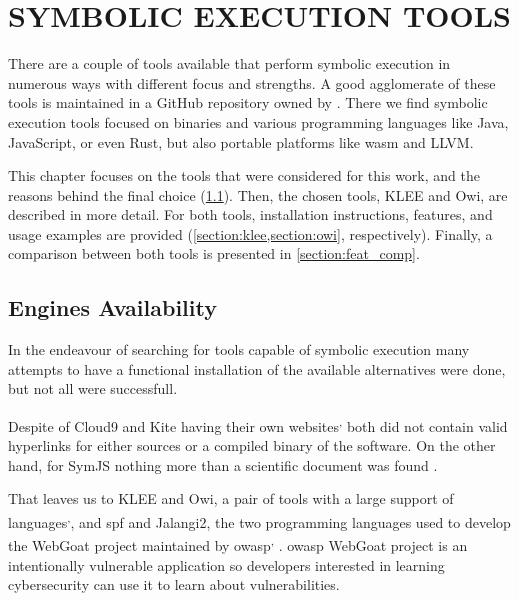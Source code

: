 \chapter{SYMBOLIC EXECUTION TOOLS}\label{chap:symbolic_execution_tools}

There are a couple of tools available that perform symbolic execution in numerous ways with different focus and strengths. A good agglomerate of these tools is maintained in a GitHub repository owned by \citeauthor{Luckow2017}. There we find symbolic execution tools focused on binaries and various programming languages like Java, JavaScript, or even Rust, but also portable platforms like \acrshort{wasm} and LLVM.

This chapter focuses on the tools that were considered for this work, and the reasons behind the final choice (\cref{section:engines_availability}). Then, the chosen tools, KLEE and Owi, are described in more detail. For both tools, installation instructions, features, and usage examples are provided (\cref{section:klee,section:owi}, respectively). Finally, a comparison between both tools is presented in \cref{section:feat_comp}.

\section{Engines Availability}\label{section:engines_availability}

In the endeavour of searching for tools capable of symbolic execution many attempts to have a functional installation of the available alternatives were done, but not all were successfull.

Despite of Cloud9 and Kite having their own websites\textsuperscript{,} both did not contain valid hyperlinks for either sources or a compiled binary of the software. On the other hand, for SymJS nothing more than a scientific document was found \citep{Li2014}.

That leaves us to KLEE and Owi, a pair of tools with a large support of languages\textsuperscript{,}, and \acrshort{spf} and Jalangi2, the two programming languages used to develop the WebGoat project maintained by \acrshort{owasp}\textsuperscript{,}%
. \acrshort{owasp} WebGoat project is an intentionally vulnerable application so developers interested in learning cybersecurity can use it to learn about vulnerabilities\footnotemark[5]%
.

